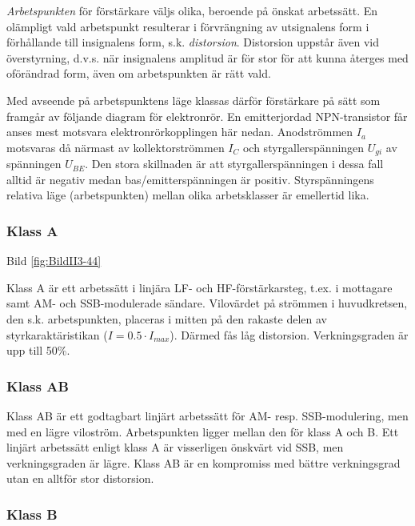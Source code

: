 \emph{Arbetspunkten} för förstärkare väljs olika, beroende på önskat
arbetssätt. En olämpligt vald arbetspunkt resulterar i förvrängning av
utsignalens form i förhållande till insignalens form,
s.k. \emph{distorsion}. Distorsion uppstår även vid överstyrning,
d.v.s. när insignalens amplitud är för stor för att kunna återges med
oförändrad form, även om arbetspunkten är rätt vald.

\begin{rev-omarbetas}
Med avseende på arbetspunktens läge klassas därför förstärkare på sätt
som framgår av följande diagram för elektronrör. En emitterjordad
NPN-transistor får anses mest motsvara elektronrörkopplingen här
nedan.  Anodströmmen \(I_a\) motsvaras då närmast av kollektorströmmen
\(I_C\) och styrgallerspänningen \(U_{gi}\) av spänningen
\(U_{BE}\). Den stora skillnaden är att styrgallerspänningen i dessa
fall alltid är negativ medan bas/emitterspänningen är
positiv. Styrspänningens relativa läge (arbetspunkten) mellan olika
arbetsklasser är emellertid lika.
\end{rev-omarbetas}

\subsubsection{Klass A}

Bild \ref{fig:BildII3-44}

Klass A är ett arbetssätt i linjära LF- och HF-förstärkarsteg, t.ex. i
mottagare samt AM- och SSB-modulerade sändare. Vilovärdet på strömmen
i huvudkretsen, den s.k. arbetspunkten, placeras i mitten på den
rakaste delen av styrkaraktäristikan (\(I=0.5\cdot I_{max}\)).  Därmed
fås låg distorsion. Verkningsgraden är upp till 50\%.

\subsubsection{Klass AB}

Klass AB är ett godtagbart linjärt arbetssätt för AM-
resp. SSB-modulering, men med en lägre viloström. Arbetspunkten ligger
mellan den för klass A och B. Ett linjärt arbetssätt enligt klass A är
visserligen önskvärt vid SSB, men verkningsgraden är lägre. Klass AB
är en kompromiss med bättre verkningsgrad utan en alltför stor
distorsion.

\subsubsection{Klass B}


